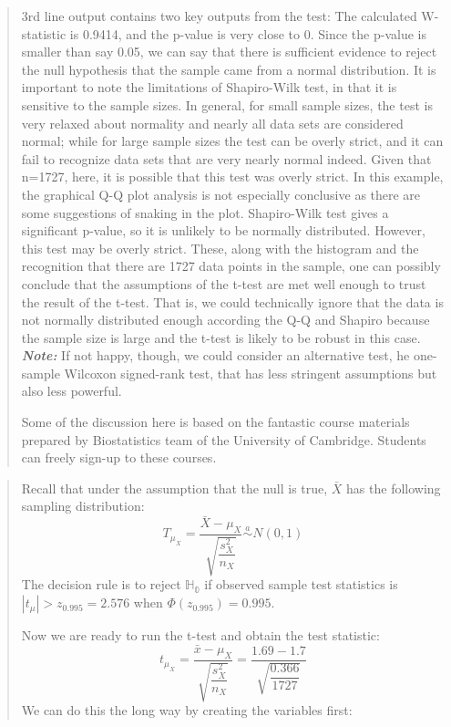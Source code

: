 \documentclass[
]{article}
\begin{document}
\begin{quote}
3rd line output contains two key outputs from the test: The calculated
W-statistic is 0.9414, and the p-value is very close to 0. Since the
p-value is smaller than say 0.05, we can say that there is sufficient
evidence to reject the null hypothesis that the sample came from a
normal distribution. It is important to note the limitations of
Shapiro-Wilk test, in that it is sensitive to the sample sizes. In
general, for small sample sizes, the test is very relaxed about
normality and nearly all data sets are considered normal; while for
large sample sizes the test can be overly strict, and it can fail to
recognize data sets that are very nearly normal indeed. Given that
n=1727, here, it is possible that this test was overly strict. In this
example, the graphical Q-Q plot analysis is not especially conclusive as
there are some suggestions of snaking in the plot. Shapiro-Wilk test
gives a significant p-value, so it is unlikely to be normally
distributed. However, this test may be overly strict. These, along with
the histogram and the recognition that there are 1727 data points in the
sample, one can possibly conclude that the assumptions of the t-test are
met well enough to trust the result of the t-test. That is, we could
technically ignore that the data is not normally distributed enough
according the Q-Q and Shapiro because the sample size is large and the
t-test is likely to be robust in this case. \textbf{\emph{Note:}} If not
happy, though, we could consider an alternative test, he one-sample
Wilcoxon signed-rank test, that has less stringent assumptions but also
less powerful.

Some of the discussion here is based on the fantastic course materials
prepared by Biostatistics team of the University of Cambridge. Students
can freely sign-up to these courses.
\end{quote}

\begin{quote}
Recall that under the assumption that the null is true, \(\bar X\) has
the following sampling distribution: \[
T_{\mu_X} = \frac{\bar X - \mu_X}{\sqrt{\dfrac{s^2_X}{n_X}}} \overset{a}{\sim} N(0,1)
\] The decision rule is to reject \(\mathbb{H_0}\) if observed sample
test statistics is \(|t_\mu| > z_{0.995} = 2.576\) when
\(\Phi(z_{0.995}) = 0.995.\)

Now we are ready to run the t-test and obtain the test statistic: \[
t_{\mu_X} = \frac{\bar x - \mu_X}{\sqrt{\dfrac{s^2_X}{n_X}}} = \frac{1.69 - 1.7}{\sqrt{\dfrac{0.366}{1727}}}
\] We can do this the long way by creating the variables first:
\end{quote}
\end{document}

